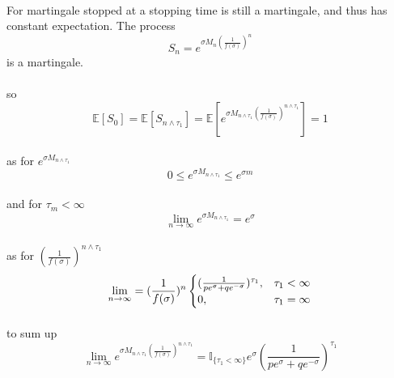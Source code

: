 \documentclass{article}
\begin{document}
\paragraph{}{For martingale stopped at a stopping time is still a martingale, and thus has constant expectation. The process
\begin{displaymath}
S_{n}=e^{\sigma M_{n}(\frac{1}{f(\sigma)})^{n}}
\end{displaymath} is a martingale.}
\paragraph{}{so \begin{displaymath}
                  \mathbb{E}[S_{0}]=\mathbb{E}[S_{n \land \tau_{1}}]=\mathbb {E}[e^{\sigma M_{n\land \tau_{1}}(\frac{1}{f(\sigma)})^{n\land \tau_{1}}}]=1
                \end{displaymath}}
\paragraph{}{as for $e^{\sigma M_{n\land \tau_{1}}}$}
\begin{displaymath}
  0\le e^{\sigma M_{n\land \tau_{1}}} \le e^{\sigma m}
\end{displaymath}
\paragraph{}{and for $\tau_{m}<\infty$ \begin{displaymath}
                                         \lim_{n \to \infty }e^{\sigma M_{n\land \tau_{1}}}=e^\sigma
                                       \end{displaymath} }
\paragraph{}{as for $(\frac{1}{f(\sigma)})^{n\land \tau_{1}}$ \begin{displaymath}
                                                                \lim_{n \to \infty}=(\frac{1}{f(\sigma)})^{n}
\begin{cases}
(\frac{1}{pe^{\sigma}+qe^{-\sigma}})^{\tau_{1}}, &\tau_{1}< \infty \cr 0, &\tau_{1}= \infty \end{cases}
                                                              \end{displaymath}}
\paragraph{}{to sum up\begin{displaymath}
                        \lim_{n \to \infty}e^{\sigma M_{n\land \tau_{1}}(\frac{1}{f(\sigma)})^{n\land \tau_{1}}}=\mathbb{I}_{\{ \tau_{1}<\infty\}}e^{\sigma}(\frac{1}{pe^{\sigma}+qe^{-\sigma}})^{\tau_{1}}
                      \end{displaymath}}
\end{document}
